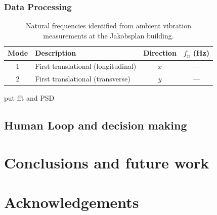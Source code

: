 \documentclass{eurodyn2026}
\begin{document}
\subsubsection{Data Processing}


\begin{table}[ht]
  \begin{center}
    \begin{tabular}{@{}clcc@{}}
      \toprule
      Mode & Description & Direction & $f_n$ (Hz) \\
      \midrule
      1 & First translational (longitudinal) & $x$ & --- \\
      2 & First translational (transverse)   & $y$ & --- \\
      \bottomrule
    \end{tabular}
  \end{center}
  \caption{Natural frequencies identified from ambient vibration measurements
           at the Jakobsplan building.}
  \label{tab:frequencies}
\end{table}
put fft and PSD

\subsection{Human Loop and decision making}


\section{Conclusions and future work}
\noindent [To be completed.]

\section*{Acknowledgements} 
\noindent [To be completed.]

\printbibliography{}
\end{document}

